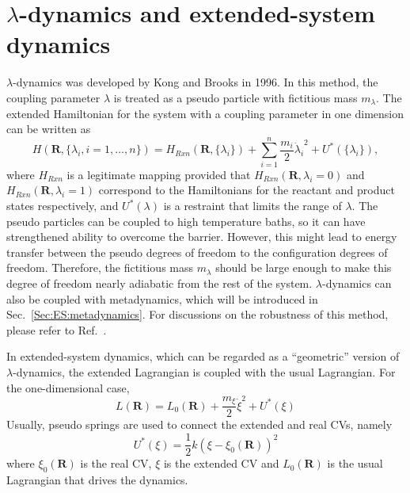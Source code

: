 \section{\texorpdfstring{$\lambda$-dynamics and extended-system dynamics}{λ-dynamics and extended-system dynamics}\label{Sec:ES:lambdadynamics}}
$\lambda$-dynamics was developed by Kong and Brooks in 1996.\cite{KongJCP1996} In this method, the coupling parameter $\lambda$ is treated as a pseudo particle with fictitious mass $m_\lambda$.
The extended Hamiltonian for the system with a coupling parameter in one dimension can be written as
\begin{equation}
	H(\mathbf{R},\{\lambda_i, i=1,\dots,n\})=H_{Rxn}(\mathbf{R},\{\lambda_i\}) + \sum_{i=1}^n\frac{m_i}{2}{\dot{\lambda}_i}^2+U^{*}(\{\lambda_i\}),
\end{equation}
where $H_{Rxn}$ is a legitimate mapping provided that $H_{Rxn}(\mathbf{R},\lambda_i=0)$ and $H_{Rxn}(\mathbf{R},\lambda_i=1)$ correspond to the Hamiltonians for the reactant and product states respectively, and $U^{*}(\lambda)$ is a restraint that limits the range of $\lambda$. The pseudo particles can be coupled to high temperature baths, so it can have strengthened ability to overcome the barrier. However, this might lead to energy transfer between the pseudo degrees of freedom to the configuration degrees of freedom. Therefore, the fictitious mass $m_\lambda$ should be large enough to make this degree of freedom nearly adiabatic from the rest of the system.\cite{AbramsJCP2006} $\lambda$-dynamics can also be coupled with metadynamics,\cite{WuJPCL2011} which will be introduced in Sec.~\ref{Sec:ES:metadynamics}. For discussions on the robustness of this method, please refer to Ref.~\cite{BielerJCTC2014}.

In extended-system dynamics, which can be regarded as a ``geometric'' version of $\lambda$-dynamics, the extended Lagrangian is coupled with the usual Lagrangian. For the one-dimensional case,
\begin{equation}
	L(\mathbf{R})=L_{0}(\mathbf{R}) + \frac{m_\xi}{2}{\dot{\xi}}^2+U^{*}(\xi)
\end{equation}
Usually, pseudo springs are used to connect the extended and real CVs, namely
\begin{equation}
	U^{*}(\xi)=\frac{1}{2}k(\xi-\xi_{0}(\mathbf{R}))^{2}
\end{equation}
where $\xi_{0}(\mathbf{R})$ is the real CV, $\xi$ is the extended CV and $L_{0}(\mathbf{R})$ is the usual Lagrangian that drives the dynamics.

